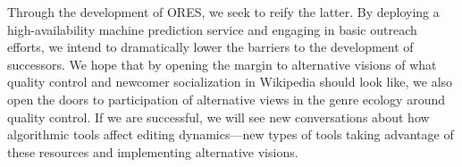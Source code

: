 Through the development of ORES, we seek to reify the latter.  By deploying a high-availability machine prediction service and engaging in basic outreach efforts, we intend to dramatically lower the barriers to the development of successors.  We hope that by opening the margin to alternative visions of what quality control and newcomer socialization in Wikipedia should look like, we also open the doors to participation of alternative views in the genre ecology around quality control.  If we are successful, we will see new conversations about how algorithmic tools affect editing dynamics---new types of tools taking advantage of these resources and implementing alternative visions.
